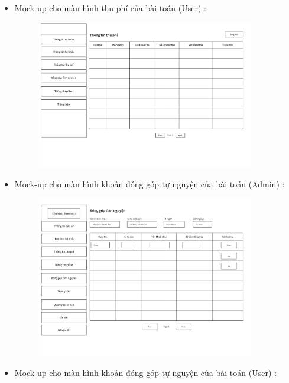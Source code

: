 \documentclass{article}
\begin{document}
\begin{itemize}
\begin{figure}[H]
    \end{figure}
    \vspace{3cm}
    \item Mock-up cho màn hình thu phí của bài toán (User) :
    \begin{figure}[H]
        \centering
        \includegraphics[width=0.9\textwidth]{Ảnh chương 4/Màn hình khoản thu (cư dân).png}
    \end{figure}
    \item Mock-up cho màn hình khoản đóng góp tự nguyện của bài toán (Admin) :
    \begin{figure}[H]
        \centering
        \includegraphics[width=0.9\textwidth]{Ảnh chương 4/Màn hình đóng góp tình nguyện.png}
    \end{figure}
    \vspace{1cm}
    \item Mock-up cho màn hình khoản đóng góp tự nguyện của bài toán (User) :
    \begin{figure}[H]

\end{figure}
\end{itemize}
\end{document}
